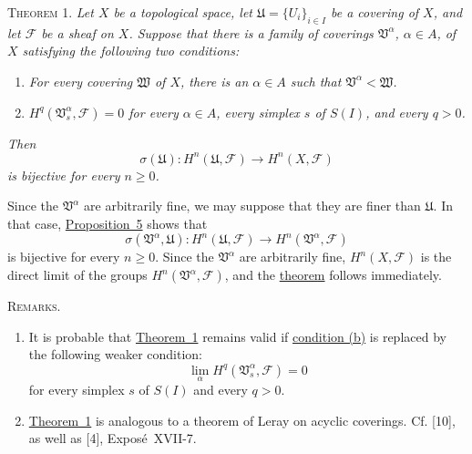 \label{fac:I:4:no:29:thm:1}
\textsc{Theorem 1.} \textit{Let $X$ be a topological space, let $\mathfrak{U}=\{U_i\}_{i\in I}$ be a covering of $X$, and let $\mathcal{F}$ be a sheaf on $X$. Suppose that there is a family of coverings $\mathfrak{V}^{\alpha}$, $\alpha\in A$, of $X$ satisfying the following two conditions:}

\begin{enumerate}[label=(\alph*),leftmargin=2.5em]
\item{}\label{fac:I:4:no:29:thm:1:item:a} \textit{For every covering $\mathfrak{W}$ of $X$, there is an $\alpha\in A$ such that $\mathfrak{V}^{\alpha}<\mathfrak{W}$.}
\item{}\label{fac:I:4:no:29:thm:1:item:b} \textit{$H^q(\mathfrak{V}^{\alpha}_s,\mathcal{F})=0$ for every $\alpha\in A$, every simplex $s$ of $S(I)$, and every $q>0$.}
\end{enumerate}

\textit{Then}
\[
\sigma(\mathfrak{U}):H^n(\mathfrak{U},\mathcal{F})
\longrightarrow H^n(X,\mathcal{F})
\]
\textit{is bijective for every $n\geq0$.}

Since the $\mathfrak{V}^{\alpha}$ are arbitrarily fine, we may suppose that they are finer than $\mathfrak{U}$. In that case, \hyperref[fac:I:4:no:29:prop:5]{Proposition~5} shows that
\[
\sigma(\mathfrak{V}^{\alpha},\mathfrak{U}):
H^n(\mathfrak{U},\mathcal{F})
\longrightarrow H^n(\mathfrak{V}^{\alpha},\mathcal{F})
\]
is bijective for every $n\geq0$. Since the $\mathfrak{V}^{\alpha}$ are arbitrarily fine, $H^n(X,\mathcal{F})$ is the direct limit of the groups $H^n(\mathfrak{V}^{\alpha},\mathcal{F})$, and the \hyperref[fac:I:4:no:29:thm:1]{theorem} follows immediately.

\label{fac:I:4:no:29:remarks}
\textsc{Remarks.}
\begin{enumerate}[label=(\arabic*),leftmargin=2.5em]
\item{}\label{fac:I:4:no:29:remark:1} It is probable that \hyperref[fac:I:4:no:29:thm:1]{Theorem~1} remains valid if \hyperref[fac:I:4:no:29:thm:1:item:b]{condition (b)} is replaced by the following weaker condition:
\[
\lim_{\alpha}H^q(\mathfrak{V}^{\alpha}_s,\mathcal{F})=0
\]
for every simplex $s$ of $S(I)$ and every $q>0$.
\item{}\label{fac:I:4:no:29:remark:2} \hyperref[fac:I:4:no:29:thm:1]{Theorem~1} is analogous to a theorem of Leray on acyclic coverings. Cf. [10], as well as [4], Exposé~XVII-7.
\end{enumerate}
